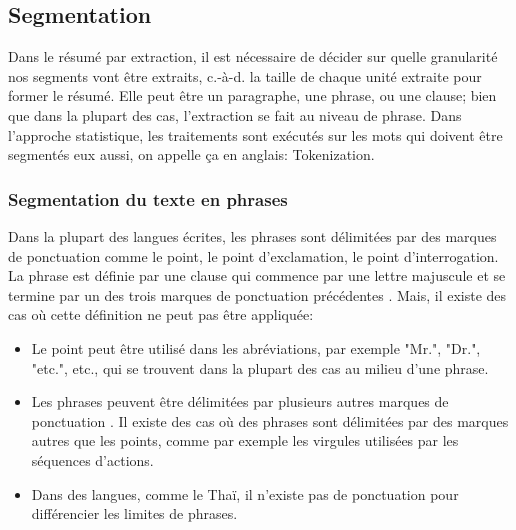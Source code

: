 \documentclass[a4paper,12pt,oneside]{../use/ESIthesis}
\begin{document}
\subsection{Segmentation}

Dans le résumé par extraction, il est nécessaire de décider sur quelle granularité nos segments vont être extraits, c.-à-d.  la taille de chaque unité extraite pour former le résumé. 
Elle peut être un paragraphe, une phrase, ou une clause; bien que dans la plupart des cas, l'extraction se fait au niveau de phrase. 
Dans l'approche statistique, les traitements sont exécutés sur les mots qui doivent être segmentés eux aussi, on appelle ça en anglais: Tokenization. 

\subsubsection{Segmentation du texte en phrases}

Dans la plupart des langues écrites, les phrases sont délimitées par des marques de ponctuation comme le point, le point d'exclamation, le point d'interrogation. 
La phrase est définie par une clause qui commence par une lettre majuscule et se termine par un des trois marques de ponctuation précédentes \cite{90-nunberg}. 
Mais, il existe des cas où cette définition ne peut pas être appliquée: 
\begin{itemize}
\item Le point peut être utilisé dans les abréviations, par exemple "Mr.", "Dr.", "etc.", etc., qui se trouvent dans la plupart des cas au milieu d'une phrase. 
\item Les phrases peuvent être délimitées par plusieurs autres marques de ponctuation \cite{10-palmer}. 
Il existe des cas où des phrases sont délimitées par des marques autres que les points, comme par exemple les virgules utilisées par les séquences d'actions. 
\item Dans des langues, comme le Thaï, il n'existe pas de ponctuation pour différencier les limites de phrases. 
\end{itemize}
\end{document}

